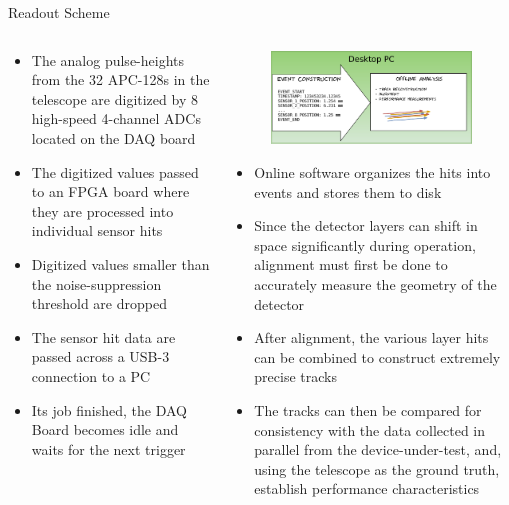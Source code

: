\documentclass[final]{beamer}
\newlength{\onecolwide}
\newlength{\readoutimgheight}
\newlength{\readoutimgwidth}
\begin{document}
\begin{frame}[t]
\begin{exampleblock}{Readout Scheme}
\begin{columns}[t]
\begin{column}{\onecolwide}
\begin{figure}
      \end{figure}
      \footnotesize
      \begin{itemize}
      \itemsep0em 
        \item The analog pulse-heights from the 32 APC-128s in the telescope are digitized by 8 high-speed 4-channel ADCs located on the DAQ board
        \item The digitized values passed to an FPGA board where they are processed into individual sensor hits
        \item Digitized values smaller than the noise-suppression threshold are dropped
        \item The sensor hit data are passed across a USB-3 connection to a PC
        \item Its job finished, the DAQ Board becomes idle and waits for the next trigger
      \end{itemize}
    \end{column}
    \begin{column}{\onecolwide}
      \begin{figure}
        \centering
        \includegraphics[height=\readoutimgheight, width=\readoutimgwidth]{../figures/Telescope_Data_Flow_Stage_III.pdf}
      \end{figure}
      \footnotesize
      \begin{itemize}
        \itemsep0em 
        \item Online software organizes the hits into events and stores them to disk
        \item Since the detector layers can shift in space significantly during operation, alignment must first be done to accurately measure the geometry of the detector
        \item After alignment, the various layer hits can be combined to construct extremely precise tracks
        \item The tracks can then be compared for consistency with the data collected in parallel from the device-under-test, and, using the telescope as the ground truth, establish performance characteristics
      \end{itemize}
    \end{column}
  \end{columns}
\end{exampleblock}



\end{frame}
\end{document}
